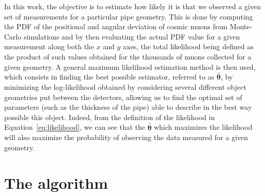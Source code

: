 \documentclass[a4paper, 11pt]{report}
\begin{document}
In this work, the objective is to estimate how likely it is that we observed a given set of measurements for a particular pipe geometry. This is done by computing the PDF of the positional and angular deviation of cosmic muons from Monte-Carlo simulations and by then evaluating the actual PDF value for a given measurement along both the $x$ and $y$ axes, the total likelihood being defined as the product of such values obtained for the thousands of muons collected for a given geometry. A general maximum likelihood estimation method is then used, which consists in finding the best possible estimator, referred to as $\bm \hat \theta$, by minimizing the log-likelihood obtained by considering several different object geometries put between the detectors, allowing us to find the optimal set of parameters (such as the thickness of the pipe) able to describe in the best way possible this object. Indeed, from the definition of the likelihood in Equation~\ref{eq:likelihood}, we can see that the $\bm \hat \theta$ which maximizes the likelihood will also maximize the probability of observing the data measured for a given geometry.



























\chapter{The algorithm} \label{chapter:algorithm}
\end{document}
